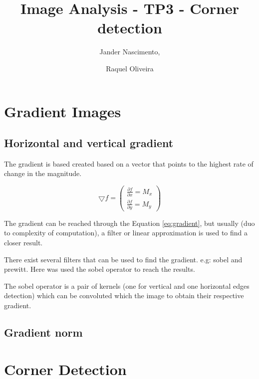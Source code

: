 \documentclass{article}
\begin{document}
\title{Image Analysis - TP3 - Corner detection}

\author{Jander Nascimento, 
\and Raquel Oliveira}

\maketitle

\section{Gradient Images}
	
	\subsection{Horizontal and vertical gradient}

	The gradient is based created based on a vector that points to the highest rate of change in the magnitude. 

\begin{equation}
\bigtriangledown f = \begin{pmatrix}
\frac{\partial f}{\partial x} = M_x\\ 
\frac{\partial f}{\partial y} = M_y
\end{pmatrix}
\label{eq:gradient}
\end{equation}

The gradient can be reached through the Equation \ref{eq:gradient}, but usually (duo to complexity of computation), a filter or linear approximation is used to find a closer result.

There exist several filters that can be used to find the gradient. e.g: sobel and prewitt. Here was used the sobel operator to reach the results.

The sobel operator is a pair of kernels (one for vertical and one horizontal edges detection) which can be convoluted which the image to obtain their respective gradient.


	
	\subsection{Gradient norm}


\section{Corner Detection}
\end{document}
